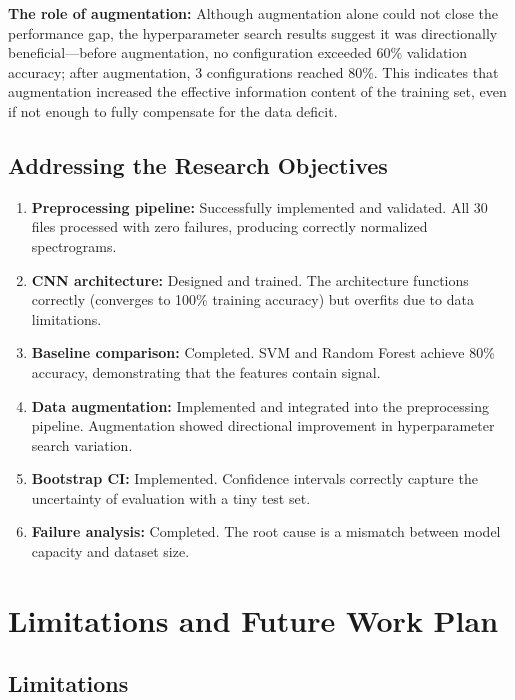 \documentclass[12pt,a4paper,oneside]{report}
\begin{document}
\textbf{The role of augmentation:} Although augmentation alone could not close the performance gap, the hyperparameter search results suggest it was directionally beneficial---before augmentation, no configuration exceeded 60\% validation accuracy; after augmentation, 3 configurations reached 80\%. This indicates that augmentation increased the effective information content of the training set, even if not enough to fully compensate for the data deficit.

\section{Addressing the Research Objectives}

\begin{enumerate}
    \item \textbf{Preprocessing pipeline:} Successfully implemented and validated. All 30 files processed with zero failures, producing correctly normalized spectrograms.
    \item \textbf{CNN architecture:} Designed and trained. The architecture functions correctly (converges to 100\% training accuracy) but overfits due to data limitations.
    \item \textbf{Baseline comparison:} Completed. SVM and Random Forest achieve 80\% accuracy, demonstrating that the features contain signal.
    \item \textbf{Data augmentation:} Implemented and integrated into the preprocessing pipeline. Augmentation showed directional improvement in hyperparameter search variation.
    \item \textbf{Bootstrap CI:} Implemented. Confidence intervals correctly capture the uncertainty of evaluation with a tiny test set.
    \item \textbf{Failure analysis:} Completed. The root cause is a mismatch between model capacity and dataset size.
\end{enumerate}

\chapter{Limitations and Future Work Plan}
\label{ch:limitations}

\section{Limitations}
\end{document}
